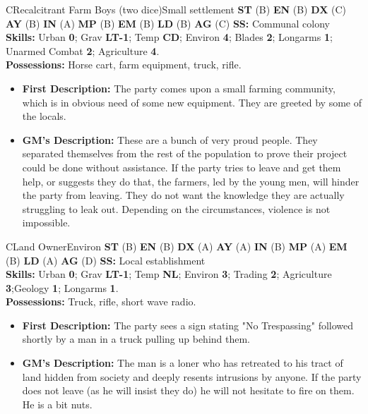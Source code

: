 \hrulefill

\begin{npc}{C}{Recalcitrant Farm Boys (two dice)}{Small settlement}
\textbf{ST} (B) \textbf{EN} (B) \textbf{DX} (C) \textbf{AY} (B) \textbf{IN} (A) \textbf{MP} (B) \textbf{EM} (B) \textbf{LD} (B) \textbf{AG} (C) \textbf{SS:} Communal colony \\
\textbf{Skills:} Urban \textbf{0}; Grav \textbf{LT-1}; Temp  \textbf{CD}; Environ \textbf{4}; Blades \textbf{2}; Longarms \textbf{1}; Unarmed Combat \textbf{2}; Agriculture \textbf{4}. \\
\textbf{Possessions:} Horse cart, farm equipment, truck, rifle. 
\begin{itemize}
\item \textbf{First Description:} The party comes upon a small farming community, which is in obvious need of some new equipment. They are 
greeted by some of the locals. 
\item \textbf{GM's Description:} These are a bunch of very proud people. They separated themselves from the rest of the population to prove 
their project could be done without assistance. If the party tries to leave and get them help, or suggests they do that, the farmers, led by 
the young men, will hinder the party from leaving. They do not want the knowledge they are actually struggling to leak out. Depending 
on the circumstances, violence is not impossible. 
\end{itemize}
\end{npc}

\hrulefill

\begin{npc}{C}{Land Owner}{Environ}
\textbf{ST} (B) \textbf{EN} (B) \textbf{DX} (A) \textbf{AY} (A) \textbf{IN} (B) \textbf{MP} (A) \textbf{EM} (B) \textbf{LD} (A) \textbf{AG} (D) \textbf{SS:} Local establishment \\
\textbf{Skills:} Urban \textbf{0}; Grav \textbf{LT-1}; Temp  \textbf{NL}; Environ \textbf{3}; Trading \textbf{2}; Agriculture \textbf{3};Geology \textbf{1}; 
Longarms \textbf{1}. \\
\textbf{Possessions:} Truck, rifle, short wave radio. 
\begin{itemize}
\item \textbf{First Description:}  The party sees a sign stating "No Trespassing" followed shortly by a man in a truck pulling up behind them. 
\item \textbf{GM's Description:} The man is a loner who has retreated to his tract of land hidden from society and deeply resents intrusions by 
anyone. If the party does not leave (as he will insist they do) he will not hesitate to fire on them. He is a bit nuts. 
\end{itemize}
\end{npc}

